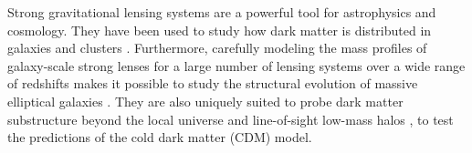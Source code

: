 Strong gravitational lensing systems 
are a powerful tool for astrophysics and cosmology.
They have been used to study how dark matter is distributed in galaxies and  clusters 
\citep[e.g.,][]{kochanek1991a, blandford1992a, broadhurst2000a,  koopmans2002a, 
bolton2006a, clowe2006a, koopmans2006a, bradac2008a, vegetti2009a, huang2009a, jullo2010a,
tessore2016a, monna2017a, jauzac2018a, 
shajib2019a, meneghetti2020a}.
Furthermore, carefully modeling the mass profiles of galaxy-scale strong lenses for a large number of lensing systems 
over a wide range of redshifts makes it possible to  study the structural evolution 
of massive elliptical galaxies .
They are also uniquely suited to probe 
dark matter substructure beyond the local universe and line-of-sight low-mass halos
\citep[e.g.,][]{vegetti2014a, hezaveh2016a, vegetti2018a, ritondale2019a, diazrivero2020a, cagan-sengul2022a, nierenberg2023a}, 
to test the predictions of the cold dark matter (CDM) model.


